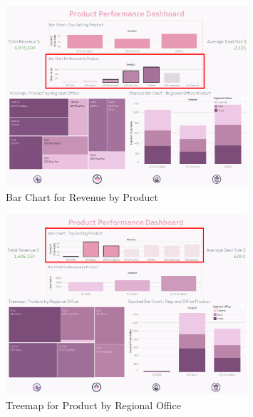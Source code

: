 \documentclass{article}
\begin{document}
\begin{figure}[h!]
    \centering
    \includegraphics[width=0.8\textwidth]{resources/swappy-20240527_160042.png}
    \caption{Bar Chart for Revenue by Product}
    \label{fig:revenue_by_product_bar_chart}
\end{figure}

\begin{figure}[h!]
    \centering
    \includegraphics[width=0.8\textwidth]{resources/swappy-20240527_160111.png}
    \caption{Treemap for Product by Regional Office}
    \label{fig:product_by_regional_office_treemap}
\end{figure}
\clearpage
\end{document}
